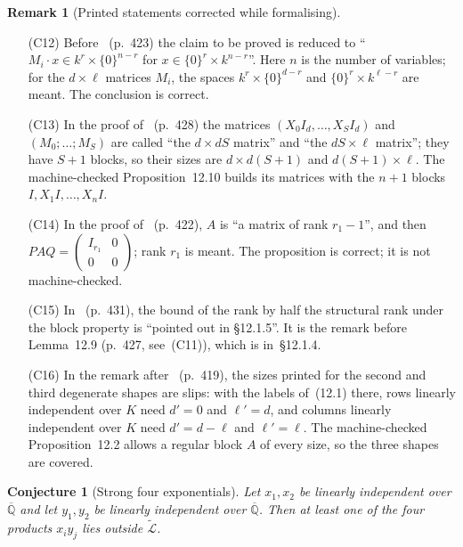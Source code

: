 \documentclass[11pt,a4paper]{article}
\theoremstyle{plain}
\newtheorem{conjecture}[theorem]{Conjecture}
\theoremstyle{definition}
\newtheorem{remark}[theorem]{Remark}
\newcommand{\Alg}{\overline{\mathbb{Q}}}
\newcommand{\aLogs}{\widetilde{\mathcal{L}}}
\begin{document}
\begin{remark}[Printed statements corrected while formalising]
\begin{itemize}
$k$-equivalent to one whose upper left $r\times r$ block is regular; its rank is then at least $r$, and its
structural rank at most $2r$. As printed, every square matrix over such a space would be regular, which fails for
$E=k$ and $\operatorname{diag}(1,0)$.
\item[(C12)] Before~\cite[Proposition~12.5]{waldschmidt-book} (p.~423) the claim to be proved is reduced to
``$M_{i}\cdot x\in k^{r}\times\{0\}^{n-r}$ for $x\in\{0\}^{r}\times k^{n-r}$''. Here $n$ is the number of variables;
for the $d\times\ell$ matrices $M_{i}$, the spaces $k^{r}\times\{0\}^{d-r}$ and $\{0\}^{r}\times k^{\ell-r}$ are
meant. The conclusion is correct.
\item[(C13)] In the proof of~\cite[Lemma~12.11]{waldschmidt-book} (p.~428) the matrices
$(X_{0}I_{d},\dots,X_{S}I_{d})$ and $(M_{0};\dots;M_{S})$ are called ``the $d\times dS$ matrix'' and ``the
$dS\times\ell$ matrix''; they have $S+1$ blocks, so their sizes are $d\times d(S+1)$ and $d(S+1)\times\ell$. The
machine-checked Proposition~12.10 builds its matrices with the $n+1$ blocks $I,X_{1}I,\dots,X_{n}I$.
\item[(C14)] In the proof of~\cite[Proposition~12.4]{waldschmidt-book} (p.~422), $A$ is ``a matrix of rank
$r_{1}-1$'', and then $PAQ=\left(\begin{smallmatrix}I_{r_{1}}&0\\0&0\end{smallmatrix}\right)$; rank $r_{1}$ is meant.
The proposition is correct; it is not machine-checked.
\item[(C15)] In~\cite[\S12.1.6]{waldschmidt-book} (p.~431), the bound of the rank by half the structural rank under
the block property is ``pointed out in \S12.1.5''. It is the remark before Lemma~12.9 (p.~427, see~(C11)), which is
in~\S12.1.4.
\item[(C16)] In the remark after~\cite[Proposition~12.2]{waldschmidt-book} (p.~419), the sizes printed for the second
and third degenerate shapes are slips: with the labels of~(12.1) there, rows linearly independent over $K$ need
$d'=0$ and $\ell'=d$, and columns linearly independent over $K$ need $d'=d-\ell$ and $\ell'=\ell$. The machine-checked Proposition~12.2
allows a regular block $A$ of every size, so the three shapes are covered.
\end{itemize}
\end{remark}

\begin{conjecture}[Strong four exponentials]\label{conj:sfe}
Let $x_{1},x_{2}$ be linearly independent over $\Alg$ and let $y_{1},y_{2}$ be linearly
independent over $\Alg$. Then at least one of the four products $x_{i}y_{j}$ lies outside
$\aLogs$.
\end{conjecture}
\end{document}
